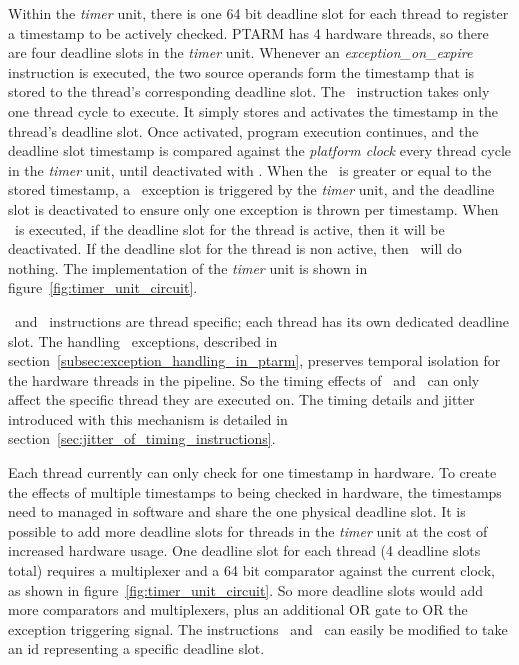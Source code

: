 Within the \emph{timer} unit, there is one 64 bit deadline slot for each thread to register a timestamp to be actively checked. 
PTARM has 4 hardware threads, so there are four deadline slots in the \emph{timer} unit. 
Whenever an \emph{exception\_on\_expire} instruction is executed, the two source operands form the timestamp that is stored to the thread's corresponding deadline slot.
The \exceptiononexpire\ instruction takes only one thread cycle to execute.
It simply stores and activates the timestamp in the thread's deadline slot.
Once activated, program execution continues, and the deadline slot timestamp is compared against the \emph{platform clock} every thread cycle in the \emph{timer} unit, until deactivated with \deactivateexception.
When the \platformclock\ is greater or equal to the stored timestamp, a \timerexpired\ exception is triggered by the \emph{timer} unit, and the deadline slot is deactivated to ensure only one exception is thrown per timestamp.
When \deactivateexception\ is executed, if the deadline slot for the thread is active, then it will be deactivated. 
If the deadline slot for the thread is non active, then \deactivateexception\ will do nothing.
The implementation of the \emph{timer} unit is shown in figure~\ref{fig:timer_unit_circuit}.   

\Exceptiononexpire\ and \deactivateexception\ instructions are thread specific; each thread has its own dedicated deadline slot.
The handling \timerexpired\ exceptions, described in section~\ref{subsec:exception_handling_in_ptarm}, preserves temporal isolation for the hardware threads in the pipeline.
So the timing effects of \exceptiononexpire\ and \deactivateexception\ can only affect the specific thread they are executed on.
The timing details and jitter introduced with this mechanism is detailed in section~\ref{sec:jitter_of_timing_instructions}.

Each thread currently can only check for one timestamp in hardware. 
To create the effects of multiple timestamps to being checked in hardware, the timestamps need to managed in software and share the one physical deadline slot.
It is possible to add more deadline slots for threads in the \emph{timer} unit at the cost of increased hardware usage.
One deadline slot for each thread (4 deadline slots total) requires a multiplexer and a 64 bit comparator against the current clock, as shown in figure~\ref{fig:timer_unit_circuit}.
So more deadline slots would add more comparators and multiplexers, plus an additional OR gate to OR the exception triggering signal. 
The instructions \exceptiononexpire\ and \deactivateexception\ can easily be modified to take an id representing a specific deadline slot.

